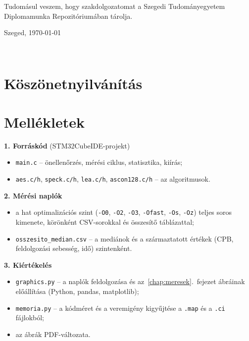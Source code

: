 \documentclass[a4paper,12pt]{report}
\theoremstyle{definition}
\theoremstyle{remark}
\begin{document}
Tudomásul veszem, hogy szakdolgozatomat a Szegedi Tudományegyetem Diplomamunka Repozitóriumában tárolja.

\vspace{1cm}
\noindent Szeged, \today

\begin{flushright}
 \vspace*{1cm}
 \makebox[7cm]{\rule{6cm}{.4pt}}\\
\end{flushright}

\chapter*{Köszönetnyilvánítás}


\chapter*{Mellékletek}

\medskip
\noindent\textbf{1. Forráskód} (STM32CubeIDE-projekt)
\begin{itemize}
	\item \texttt{main.c} -- önellenőrzés, mérési ciklus, statisztika, kiírás;
	\item \texttt{aes.c/h}, \texttt{speck.c/h}, \texttt{lea.c/h}, \texttt{ascon128.c/h} -- az algoritmusok.
\end{itemize}

\noindent\textbf{2. Mérési naplók}
\begin{itemize}
	\item a hat optimalizációs szint (\texttt{-O0}, \texttt{-O2}, \texttt{-O3}, \texttt{-Ofast}, \texttt{-Os}, \texttt{-Oz}) teljes soros kimenete, körönként CSV-sorokkal és összesítő táblázattal;
	\item \texttt{osszesito\_median.csv} -- a mediánok és a származtatott értékek (CPB, feldolgozási sebesség, idő) szintenként.
\end{itemize}

\noindent\textbf{3. Kiértékelés}
\begin{itemize}
	\item \texttt{graphics.py} -- a naplók feldolgozása és az~\ref{chap:meresek}.~fejezet ábráinak előállítása (Python, pandas, matplotlib);
	\item \texttt{memoria.py} -- a kódméret és a veremigény kigyűjtése a \texttt{.map} és a \texttt{.ci} fájlokból;
	\item az ábrák PDF-változata.
\end{itemize}
\end{document}
